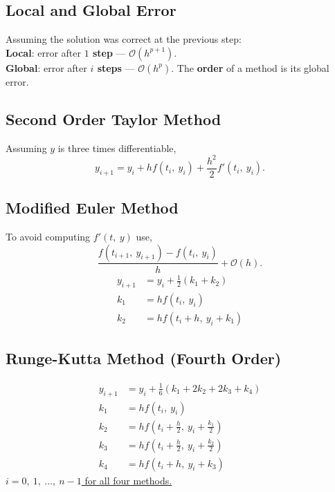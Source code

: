 \documentclass{article}
\begin{document}
\begin{multicols}{3}
    \subsection{Local and Global Error}
    Assuming the solution was correct at the previous step: \\
    \textbf{Local}: error after \textbf{\(1\) step} --- \(\mathcal{O}\left( h^{p + 1} \right)\). \\
    \textbf{Global}: error after \textbf{\(i\) steps} --- \(\mathcal{O}\left( h^p \right)\).
    The \textbf{order} of a method is its global error.
    \subsection{Second Order Taylor Method}
    Assuming \(y\) is three times differentiable,
    \begin{equation*}
        y_{i + 1} = y_i + h f\left( t_i,\: y_i \right) + \frac{h^2}{2} f'\left( t_i,\: y_i \right).
    \end{equation*}
    \subsection{Modified Euler Method}
    To avoid computing \(f'\left( t,\: y \right)\) use,
    \begin{equation*}
        \frac{f\left( t_{i + 1},\: y_{i + 1} \right) - f\left( t_i,\: y_i \right)}{h} + \mathcal{O}\left( h \right).
    \end{equation*}
    \begin{align*}
        y_{i + 1} & = y_i + \frac{1}{2} \left( k_1 + k_2 \right) \\
        k_1       & = h f\left( t_i,\: y_i \right)               \\
        k_2       & = h f\left( t_i + h,\: y_i + k_1 \right)
    \end{align*}
    \subsection{Runge-Kutta Method (Fourth Order)}
    \begin{align*}
        y_{i + 1} & = y_i + \frac{1}{6} \left( k_1 + 2 k_2 + 2 k_3 + k_4 \right) \\
        k_1       & = h f\left( t_i,\: y_i \right)                               \\
        k_2       & = h f\left( t_i + \frac{h}{2},\: y_i + \frac{k_1}{2} \right) \\
        k_3       & = h f\left( t_i + \frac{h}{2},\: y_i + \frac{k_2}{2} \right) \\
        k_4       & = h f\left( t_i + h,\: y_i + k_3 \right)
    \end{align*}
    \underline{\(i = 0,\: 1,\: \ldots,\: n - 1\) for all four methods.}

\end{multicols}
\end{document}
